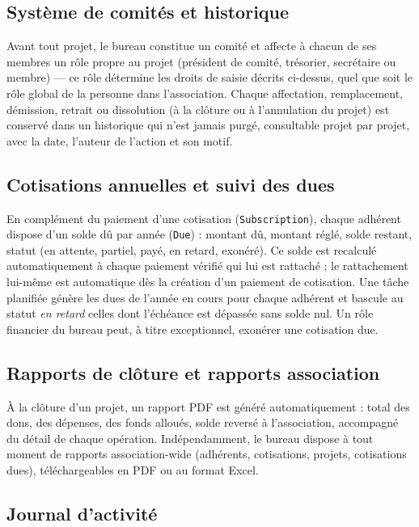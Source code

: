 \subsection{Système de comités et historique}

Avant tout projet, le bureau constitue un comité et affecte à chacun de ses
membres un rôle propre au projet (président de comité, trésorier, secrétaire
ou membre) — ce rôle détermine les droits de saisie décrits ci-dessus, quel
que soit le rôle global de la personne dans l'association. Chaque affectation,
remplacement, démission, retrait ou dissolution (à la clôture ou à
l'annulation du projet) est conservé dans un historique qui n'est jamais
purgé, consultable projet par projet, avec la date, l'auteur de l'action et
son motif.

\subsection{Cotisations annuelles et suivi des dues}

En complément du paiement d'une cotisation (\texttt{Subscription}), chaque
adhérent dispose d'un solde dû par année (\texttt{Due}) : montant dû, montant
réglé, solde restant, statut (en attente, partiel, payé, en retard, exonéré).
Ce solde est recalculé automatiquement à chaque paiement vérifié qui lui est
rattaché ; le rattachement lui-même est automatique dès la création d'un
paiement de cotisation. Une tâche planifiée génère les dues de l'année en
cours pour chaque adhérent et bascule au statut \emph{en retard} celles dont
l'échéance est dépassée sans solde nul. Un rôle financier du bureau peut, à
titre exceptionnel, exonérer une cotisation due.

\subsection{Rapports de clôture et rapports association}

À la clôture d'un projet, un rapport PDF est généré automatiquement :
total des dons, des dépenses, des fonds alloués, solde reversé à
l'association, accompagné du détail de chaque opération. Indépendamment,
le bureau dispose à tout moment de rapports association-wide (adhérents,
cotisations, projets, cotisations dues), téléchargeables en PDF ou au format
Excel.

\subsection{Journal d'activité}

